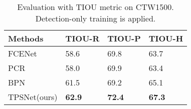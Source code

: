 \documentclass[sigconf]{acmart}
\begin{document}
	\begin{table}[t]
		\setlength{\abovecaptionskip}{0cm}  \small
		\caption{Evaluation with TIOU \cite{liu2019tightness} metric on CTW1500. Detection-only training is applied.}
		\centering
\begin{tabularx}{\linewidth}{@{}lYYY@{}}
			\toprule
			Methods & TIOU-R & TIOU-P & TIOU-H \\ \midrule
			FCENet \cite{zhu2021fourier}  & 58.6   & 69.8   & 63.7   \\
			PCR \cite{dai2021progressive}     & 58.0     & 69.9   & 63.4   \\
			BPN \cite{zhang2021adaptive} & 61.5   & 69.2   & 65.1   \\ \midrule
			TPSNet(ours)  & \textbf{62.9}   & \textbf{72.4}   & \textbf{67.3}   \\ \bottomrule
		\end{tabularx}
		\label{tab:tiou}
		\vspace{-15px}
	\end{table}
	
\end{document}
